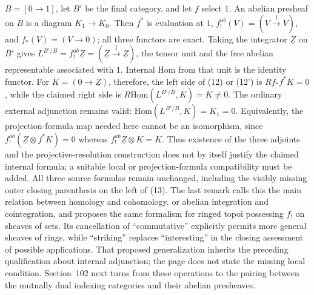 \documentclass[10pt,oneside]{book}
\begin{document}
$B=[0\to1]$, let $B'$ be the final category, and let $f$ select $1$. An abelian presheaf on $B$ is a diagram $K_1\to K_0$. Then $f^*$ is evaluation at $1$, $f_!^{ab}(V)=(V\xrightarrow{1}V)$, and $f_*(V)=(V\to0)$; all three functors are exact. Taking the integrator $\underline Z$ on $B'$ gives $L^{B'/B}=f_!^{ab}\underline Z=(\underline Z\xrightarrow{1}\underline Z)$, the tensor unit and the free abelian representable associated with $1$. Internal Hom from that unit is the identity functor. For $K=(0\to\underline Z)$, therefore, the left side of (12) or (12') is $Rf_*f^*K=0$, while the claimed right side is $R\underline{\mathrm{Hom}}(L^{B'/B},K)=K\ne0$. The ordinary external adjunction remains valid: $\mathrm{Hom}(L^{B'/B},K)=K_1=0$. Equivalently, the projection-formula map needed here cannot be an isomorphism, since $f_!^{ab}(\underline Z\otimes f^*K)=0$ whereas $f_!^{ab}\underline Z\otimes K=K$. Thus existence of the three adjoints and the projective-resolution construction does not by itself justify the claimed internal formula; a suitable local or projection-formula compatibility must be added. All three source formulas remain unchanged, including the visibly missing outer closing parenthesis on the left of (13). The last remark calls this the main relation between homology and cohomology, or abelian integration and cointegration, and proposes the same formalism for ringed topoi possessing $f_!$ on sheaves of sets. Its cancellation of ``commutative'' explicitly permits more general sheaves of rings, while ``striking'' replaces ``interesting'' in the closing assessment of possible applications. That proposed generalization inherits the preceding qualification about internal adjunction; the page does not state the missing local condition. Section~102 next turns from these operations to the pairing between the mutually dual indexing categories and their abelian presheaves.
\end{document}
